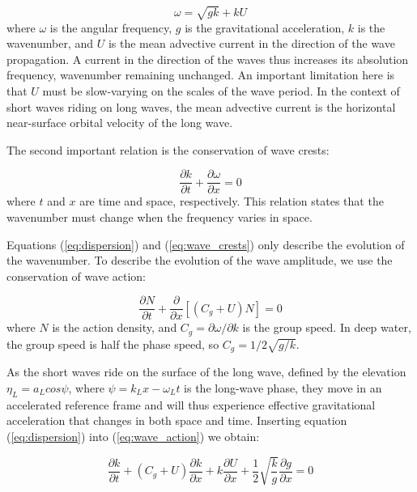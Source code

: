 \documentclass[draft]{agujournal2019}
\begin{document}
\begin{equation}
\label{eq:dispersion}
\omega = \sqrt{gk} + k U
\end{equation}
where $\omega$ is the angular frequency, $g$ is the gravitational acceleration,
$k$ is the wavenumber, and $U$ is the mean advective current in the direction
of the wave propagation.
A current in the direction of the waves thus increases its absolution frequency,
wavenumber remaining unchanged.
An important limitation here is that $U$ must be slow-varying on the scales of
the wave period.
In the context of short waves riding on long waves, the mean advective current
is the horizontal near-surface orbital velocity of the long wave.

The second important relation is the conservation of wave crests:

\begin{equation}
\label{eq:wave_crests}
\dfrac{\partial k}{\partial t}
+ \dfrac{\partial \omega}{\partial x}
= 0
\end{equation}
where $t$ and $x$ are time and space, respectively.
This relation states that the wavenumber must change when the frequency varies
in space.

Equations (\ref{eq:dispersion}) and (\ref{eq:wave_crests}) only describe the
evolution of the wavenumber.
To describe the evolution of the wave amplitude, we use the conservation of wave
action:

\begin{equation}
\label{eq:wave_action}
\dfrac{\partial N}{\partial t}
+ \dfrac{\partial}{\partial x} \left[\left(C_g + U\right)N\right]
= 0
\end{equation}
where $N$ is the action density, and $C_g = \partial \omega / \partial k$ is the
group speed.
In deep water, the group speed is half the phase speed, so $C_g = 1/2\sqrt{g/k}$.

As the short waves ride on the surface of the long wave, defined by the elevation
$\eta_L = a_L cos{\psi}$, where $\psi = k_L x - \omega_L t$ is the long-wave phase,
they move in an accelerated reference frame and will thus experience effective
gravitational acceleration that changes in both space and time.
Inserting equation (\ref{eq:dispersion}) into (\ref{eq:wave_action}) we obtain:

\begin{equation}
\label{eq:wavenumber}
\dfrac{\partial k}{\partial t}
+ \left(C_g + U\right) \dfrac{\partial k}{\partial x}
+ k \dfrac{\partial U}{\partial x}
+ \dfrac{1}{2} \sqrt{\dfrac{k}{g}} \dfrac{\partial g}{\partial x}
= 0
\end{equation}
\end{document}
